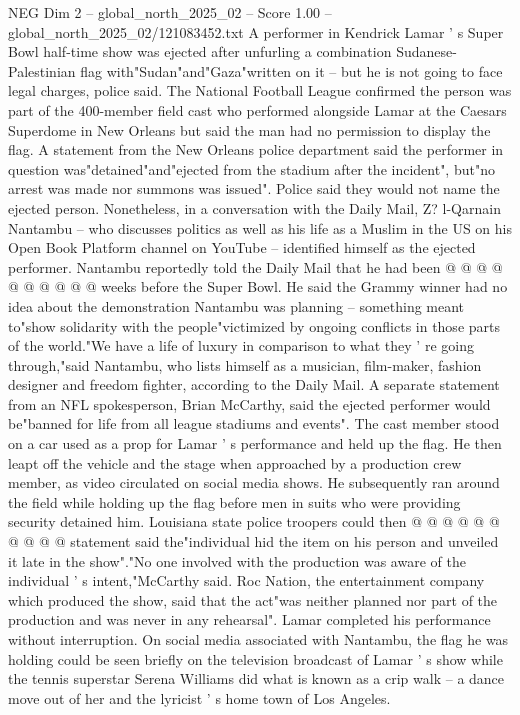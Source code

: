 \begin{textsample}{NEG Dim 2 – global\_north\_2025\_02 – Score 1.00 – global\_north\_2025\_02/121083452.txt}  \label{ex:f2_neg_008}
A performer in Kendrick Lamar ' s Super Bowl half-time show was ejected after unfurling a combination Sudanese-Palestinian flag with"Sudan"and"Gaza"written on it -- but he is not going to face legal charges, police said.
The National Football League confirmed the person was part of the 400-member field cast who performed alongside Lamar at the Caesars Superdome in New Orleans but said the man had no permission to display the flag.
A statement from the New Orleans police department said the performer in question was"detained"and"ejected from the stadium after the incident", but"no arrest was made nor summons was issued".
Police said they would not name the ejected person.
Nonetheless, in a conversation with the Daily Mail, Z? l-Qarnain Nantambu -- who discusses politics as well as his life as a Muslim in the US on his Open Book Platform channel on YouTube -- identified himself as the ejected performer.
Nantambu reportedly told the Daily Mail that he had been @ @ @ @ @ @ @ @ @ @ weeks before the Super Bowl.
He said the Grammy winner had no idea about the demonstration Nantambu was planning -- something meant to"show solidarity with the people"victimized by ongoing conflicts in those parts of the world."We have a life of luxury in comparison to what they ' re going through,"said Nantambu, who lists himself as a musician, film-maker, fashion designer and freedom fighter, according to the Daily Mail.
A separate statement from an NFL spokesperson, Brian McCarthy, said the ejected performer would be"banned for life from all league stadiums and events".
The cast member stood on a car used as a prop for Lamar ' s performance and held up the flag.
He then leapt off the vehicle and the stage when approached by a production crew member, as video circulated on social media shows.
He subsequently ran around the field while holding up the flag before men in suits who were providing security detained him.
Louisiana state police troopers could then @ @ @ @ @ @ @ @ @ @ statement said the"individual hid the item on his person and unveiled it late in the show"."No one involved with the production was aware of the individual ' s intent,"McCarthy said.
Roc Nation, the entertainment company which produced the show, said that the act"was neither planned nor part of the production and was never in any rehearsal".
Lamar completed his performance without interruption.
On social media associated with Nantambu, the flag he was holding could be seen briefly on the television broadcast of Lamar ' s show while the tennis superstar Serena Williams did what is known as a crip walk -- a dance move out of her and the lyricist ' s home town of Los Angeles.

\end{textsample}
